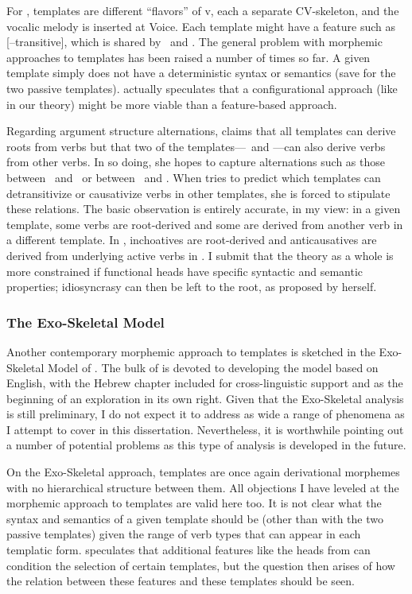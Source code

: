 For \citeauthor{arad05}, templates are different ``flavors'' of v, each a separate CV-skeleton, and the vocalic melody is inserted at Voice. Each template might have a feature such as [--transitive], which is shared by \tnif~and \thit. The general problem with morphemic approaches to templates has been raised a number of times so far. A given template simply does not have a deterministic syntax or semantics (save for the two passive templates). \citet[198]{arad05} actually speculates that a configurational approach (like in our theory) might be more viable than a feature-based approach. 

Regarding argument structure alternations, \cite{arad05} claims that all templates can derive roots from verbs but that two of the templates---\tnif~and \thit---can also derive verbs from other verbs. In so doing, she hopes to capture alternations such as those between \tkal~and \tnif~or between \tpie~and \thit.  When \citeauthor{arad05} tries to predict which templates can detransitivize or causativize verbs in other templates, she is forced to stipulate these relations. The basic observation is entirely accurate, in my view: in a given template, some verbs are root-derived and some are derived from another verb in a different template. In \tnif, inchoatives are root-derived and anticausatives are derived from underlying active verbs in \tkal. I submit that the theory as a whole is more constrained if functional heads have specific syntactic and semantic properties; idiosyncrasy can then be left to the root, as proposed by \citeauthor{arad05} herself.
	
		\subsubsection{The Exo-Skeletal Model \citep{borer13oup,borer15roots}} \label{syn:other-root:borer}
Another contemporary morphemic approach to templates is sketched in the Exo-Skeletal Model of \citet[Ch.~11]{borer13oup}. The bulk of \cite{borer13oup} is devoted to developing the model based on English, with the Hebrew chapter included for cross-linguistic support and as the beginning of an exploration in its own right. Given that the Exo-Skeletal analysis is still preliminary, I do not expect it to address as wide a range of phenomena as I attempt to cover in this dissertation. Nevertheless, it is worthwhile pointing out a number of potential problems as this type of analysis is developed in the future.

On the Exo-Skeletal approach, templates are once again derivational morphemes with no hierarchical structure between them. All objections I have leveled at the morphemic approach to templates are valid here too. It is not clear what the syntax and semantics of a given template should be (other than with the two passive templates) given the range of verb types that can appear in each templatic form. \cite{borer15roots} speculates that additional features like the heads from \cite{doron03} can condition the selection of certain templates, but the question then arises of how the relation between these features and these templates should be seen.

